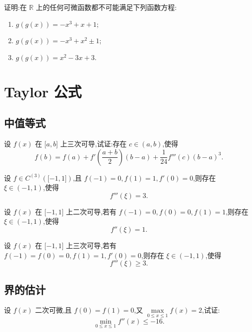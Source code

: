 \documentclass[../../数学分析培优讲义.tex]{subfiles}
\begin{document}
\begin{example}
证明:在 $\mathbb{R}$ 上的任何可微函数都不可能满足下列函数方程:
\begin{enumerate}[label=(\arabic*)]
    \item $g(g(x))=-x^3+x+1$;
    \item $g(g(x))=-x^3+x^2\pm1$;
    \item $g(g(x))=x^2-3x+3$.
\end{enumerate}
\end{example}
\exampleblank


\newpage

\section{Taylor 公式}


\subsection{中值等式}

\begin{example}
设 $f(x)$ 在 $\lbrack a,b\rbrack$ 上三次可导,试证:存在 $c\in(a,b)$,使得
\[
    f(b)=f(a)+f'\left(\dfrac{a+b}{2}\right)(b-a)
    +\dfrac{1}{24}f'''(c)(b-a)^3.
\]
\end{example}
\exampleblank

\begin{example}
设 $f\in C^{(3)}(\lbrack -1,1\rbrack)$,且 $f(-1)=0,f(1)=1,f'(0)=0$,则存在 $\xi\in(-1,1)$,使得
\[
    f'''(\xi)=3.
\]
\end{example}
\exampleblank

\begin{example}
设 $f(x)$ 在 $\lbrack -1,1\rbrack$ 上二次可导,若有 $f(-1)=0,f(0)=0,f(1)=1$,则存在 $\xi\in(-1,1)$,使得
\[
    f''(\xi)=1.
\]
\end{example}
\exampleblank

\begin{example}
设 $f(x)$ 在 $\lbrack -1,1\rbrack$ 上三次可导,若有 $f(-1)=f(0)=0,f(1)=1,f'(0)=0$,则存在 $\xi\in(-1,1)$,使得
\[
    f'''(\xi)\geq 3.
\]
\end{example}
\exampleblank



\subsection{界的估计}

\begin{example}
设 $f(x)$ 二次可微,且 $f(0)=f(1)=0$,又
$\displaystyle\max\limits_{0\leq x\leq1}f(x)=2$,试证:
\[
    \min\limits_{0\leq x\leq1}f''(x)\leq-16.
\]
\end{example}
\exampleblank
\end{document}
